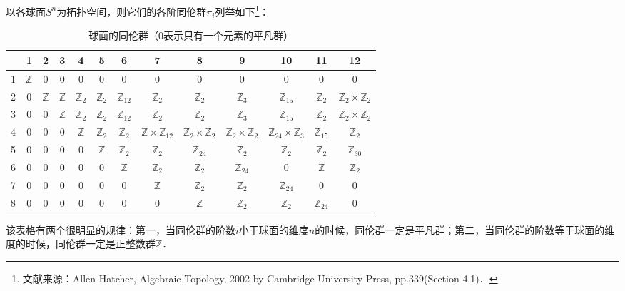 

以各球面$S^n$为拓扑空间，则它们的各阶同伦群$\pi_i$列举如下\footnote{文献来源：Allen Hatcher, Algebraic Topology, 2002 by Cambridge University Press, pp.339(Section 4.1)．}：

\begin{table}[ht]
\caption{球面的同伦群（$0$表示只有一个元素的平凡群）}\label{SphHmt_tab1}
\begin{tabular}{|c|c|c|c|c|c|c|c|c|c|c|c|c|}
\hline
 & 1 & 2 & 3 & 4 & 5 & 6 & 7 & 8 & 9 & 10 & 11 & 12 \\
\hline
1 & $\mathbb{Z}$ & 0 & 0 & 0 & 0 & 0 & 0 & 0 & 0 & 0 & 0 & 0 \\
\hline
2 & 0 & $\mathbb{Z}$ & $\mathbb{Z}$ & $\mathbb{Z}_2$ & $\mathbb{Z}_2$ & $\mathbb{Z}_{12}$ & $\mathbb{Z}_2$ & $\mathbb{Z}_2$ & $\mathbb{Z}_3$ & $\mathbb{Z}_{15}$ & $\mathbb{Z}_2$ & $\mathbb{Z}_2\times\mathbb{Z}_2$\\
\hline
3 & 0 & 0 & $\mathbb{Z}$ & $\mathbb{Z}_2$ & $\mathbb{Z}_2$ & $\mathbb{Z}_{12}$ & $\mathbb{Z}_2$ & $\mathbb{Z}_2$ & $\mathbb{Z}_3$ & $\mathbb{Z}_{15}$ & $\mathbb{Z}_2$ & $\mathbb{Z}_2\times\mathbb{Z}_2$ \\
\hline
4 & 0 & 0 & 0 & $\mathbb{Z}$ & $\mathbb{Z}_2$ & $\mathbb{Z}_2$ & $\mathbb{Z}\times\mathbb{Z}_{12}$ & $\mathbb{Z}_2\times\mathbb{Z}_2$ & $\mathbb{Z}_2\times\mathbb{Z}_2$ & $\mathbb{Z}_{24}\times\mathbb{Z}_3$ & $\mathbb{Z}_{15}$ & $\mathbb{Z}_2$ \\
\hline
5 & 0 & 0 & 0 & 0 & $\mathbb{Z}$ & $\mathbb{Z}_2$ & $\mathbb{Z}_2$ & $\mathbb{Z}_{24}$ & $\mathbb{Z}_2$ & $\mathbb{Z}_2$ & $\mathbb{Z}_2$ & $\mathbb{Z}_{30}$ \\
\hline
6 & 0 & 0 & 0 & 0 & 0 & $\mathbb{Z}$ & $\mathbb{Z}_2$ & $\mathbb{Z}_2$ & $\mathbb{Z}_{24}$ & 0 & $\mathbb{Z}$ & $\mathbb{Z}_2$ \\
\hline
7 & 0 & 0 & 0 & 0 & 0 & 0 & $\mathbb{Z}$ & $\mathbb{Z}_2$ & $\mathbb{Z}_2$ & $\mathbb{Z}_{24}$ & 0 & 0 \\
\hline
8 & 0 & 0 & 0 & 0 & 0 & 0 & 0 & $\mathbb{Z}$ & $\mathbb{Z}_2$ & $\mathbb{Z}_2$ & $\mathbb{Z}_{24}$ & 0 \\
\hline
\end{tabular}
\end{table}

该表格有两个很明显的规律：第一，当同伦群的阶数$i$小于球面的维度$n$的时候，同伦群一定是平凡群；第二，当同伦群的阶数等于球面的维度的时候，同伦群一定是正整数群$\mathbb{Z}$．
